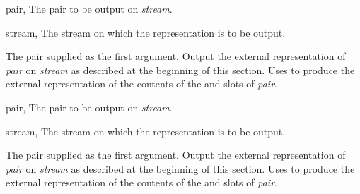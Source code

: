 \begin{optDefinition}
%
\begin{specargs}
    \item[pair, \classref{cons}] The pair to be output on {\em stream}.
    \item[stream, \classref{stream}] The stream on which the representation is
    to be output.
\end{specargs}
%
\result%
The pair supplied as the first argument.
%
\remarks%
Output the external representation of {\em pair\/} on {\em stream\/} as
described at the beginning of this section.  Uses  to
produce the external representation of the contents of the  and
 slots of {\em pair}.

%
\begin{specargs}
    \item[pair, \classref{cons}] The pair to be output on {\em stream}.
    \item[stream, \classref{stream}] The stream on which the representation is
    to be output.
\end{specargs}
%
\result%
The pair supplied as the first argument.
%
\remarks%
Output the external representation of {\em pair\/} on {\em stream\/} as
described at the beginning of this section.  Uses  to
produce the external representation of the contents of the  and
 slots of {\em pair}.

\end{optDefinition}
